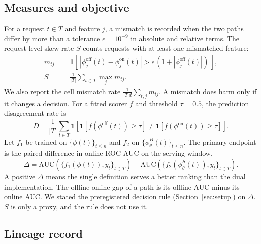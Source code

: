 \documentclass[journal]{IEEEtran}
\begin{document}
\subsection{Measures and objective}
\label{sec:measures}

For a request $t\in T$ and feature $j$, a mismatch is recorded when the two paths differ by more than a tolerance $\epsilon=10^{-9}$ in absolute and relative terms. The request-level skew rate $S$ counts requests with at least one mismatched feature:
\begin{equation}
\begin{aligned}
m_{tj}&=\mathbf{1}\!\left[\,|\phi^{\mathrm{off}}_j(t)-\phi^{\mathrm{on}}_j(t)|>\epsilon\,(1+|\phi^{\mathrm{off}}_j(t)|)\,\right],\\
S&=\frac{1}{|T|}\sum_{t\in T}\max_{j}m_{tj}.
\end{aligned}
\label{eq:skew}
\end{equation}
We also report the cell mismatch rate $\frac{1}{|T|d}\sum_{t,j}m_{tj}$. A mismatch does harm only if it changes a decision. For a fitted scorer $f$ and threshold $\tau=0.5$, the prediction disagreement rate is
\begin{equation}
D=\frac{1}{|T|}\sum_{t\in T}\mathbf{1}\!\left[\mathbf{1}[f(\phi^{\mathrm{off}}(t))\ge\tau]\neq\mathbf{1}[f(\phi^{\mathrm{on}}(t))\ge\tau]\right].
\label{eq:disagree}
\end{equation}
Let $f_1$ be trained on $\{\phi(t)\}_{t\le n}$ and $f_2$ on $\{\phi^{B}_{\theta}(t)\}_{t\le n}$. The primary endpoint is the paired difference in online ROC AUC on the serving window,
\begin{equation}
\Delta=\mathrm{AUC}\!\left(\{f_1(\phi(t)),y_t\}_{t\in T}\right)-\mathrm{AUC}\!\left(\{f_2(\phi^{S}_{\theta}(t)),y_t\}_{t\in T}\right).
\label{eq:delta}
\end{equation}
A positive $\Delta$ means the single definition serves a better ranking than the dual implementation. The offline-online gap of a path is its offline AUC minus its online AUC. We stated the preregistered decision rule (Section~\ref{sec:setup}) on $\Delta$. $S$ is only a proxy, and the rule does not use it.

\subsection{Lineage record}
\label{sec:lineage}
\end{document}
